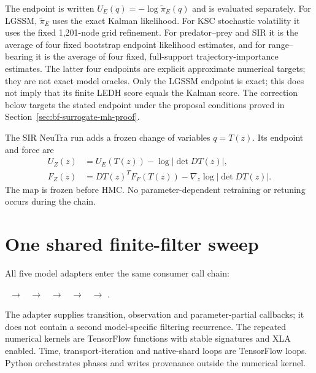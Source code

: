 The endpoint is written $U_E(q)=-\log\widetilde\pi_E(q)$ and is evaluated
separately.  For LGSSM, $\widetilde\pi_E$ uses the exact Kalman likelihood.
For KSC stochastic volatility it uses the fixed 1,201-node grid refinement.
For predator--prey and SIR it is the average of four fixed bootstrap endpoint
likelihood estimates, and for range--bearing it is the average of four fixed,
full-support trajectory-importance estimates.  The latter four endpoints are
explicit approximate numerical targets; they are not exact model oracles.
Only the LGSSM endpoint is exact; this does not imply that its finite LEDH score
equals the Kalman score.  The correction below targets the stated endpoint
under the proposal conditions proved in Section~\ref{sec:bf-surrogate-mh-proof}.

The SIR NeuTra run adds a frozen change of variables $q=T(z)$.  Its endpoint and
force are
\begin{align}
 U_Z(z) &= U_E(T(z))-\log|\det DT(z)|,\\
 F_Z(z) &= DT(z)^T F_F(T(z))
          -\nabla_z\log|\det DT(z)|.
 \label{eq:bf-surrogate-neutra-composition}
\end{align}
The map is frozen before HMC.  No parameter-dependent retraining or retuning
occurs during the chain.

\section{One shared finite-filter sweep}
\label{sec:bf-surrogate-shared-sweep}

All five model adapters enter the same consumer call chain:
\begin{center}
\small
{}\ $\rightarrow$
\ $\rightarrow$
\ $\rightarrow$
\ $\rightarrow$
\ $\rightarrow$
.
\end{center}
The adapter supplies transition, observation and parameter-partial callbacks; it
does not contain a second model-specific filtering recurrence.  The repeated
numerical kernels are TensorFlow functions with stable signatures and XLA
enabled.  Time, transport-iteration and native-shard loops are TensorFlow
loops.  Python orchestrates phases and writes provenance outside the numerical
kernel.

